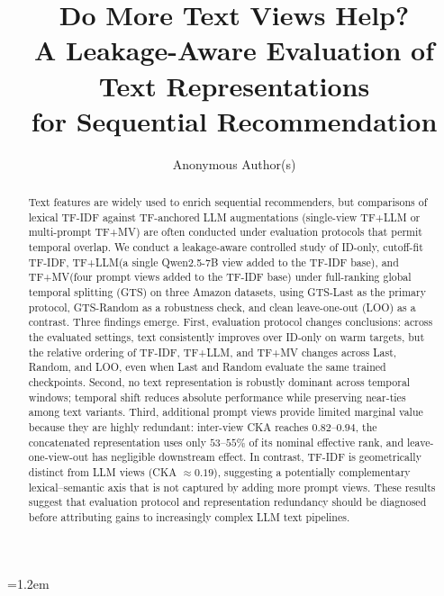 \documentclass[sigconf,natbib=true,anonymous]{acmart}
\newcommand{\tfidf}{\textsc{TF-IDF}\xspace}
\newcommand{\tfllm}{\textsc{TF+LLM}\xspace}
\newcommand{\tfmv}{\textsc{TF+MV}\xspace}
\begin{document}
\emergencystretch=1.2em

\title{Do More Text Views Help?\\
A Leakage-Aware Evaluation of Text Representations\\
for Sequential Recommendation}

\author{Anonymous Author(s)}
\renewcommand{\shortauthors}{Anonymous}

\begin{abstract}
Text features are widely used to enrich sequential recommenders, but comparisons of lexical \tfidf against TF-anchored LLM augmentations (single-view \tfllm or multi-prompt \tfmv) are often conducted under evaluation protocols that permit temporal overlap.
We conduct a leakage-aware controlled study of ID-only, cutoff-fit \tfidf, \tfllm (a single Qwen2.5-7B view added to the \tfidf base), and \tfmv (four prompt views added to the \tfidf base) under full-ranking global temporal splitting (GTS) on three Amazon datasets, using GTS-Last as the primary protocol, GTS-Random as a robustness check, and clean leave-one-out (LOO) as a contrast.
Three findings emerge.
First, evaluation protocol changes conclusions: across the evaluated settings, text consistently improves over ID-only on warm targets, but the relative ordering of \tfidf, \tfllm, and \tfmv changes across Last, Random, and LOO, even when Last and Random evaluate the same trained checkpoints.
Second, no text representation is robustly dominant across temporal windows; temporal shift reduces absolute performance while preserving near-ties among text variants.
Third, additional prompt views provide limited marginal value because they are highly redundant: inter-view CKA reaches $0.82$--$0.94$, the concatenated representation uses only $53$--$55\%$ of its nominal effective rank, and leave-one-view-out has negligible downstream effect.
In contrast, TF-IDF is geometrically distinct from LLM views (CKA $\approx 0.19$), suggesting a potentially complementary lexical--semantic axis that is not captured by adding more prompt views.
These results suggest that evaluation protocol and representation redundancy should be diagnosed before attributing gains to increasingly complex LLM text pipelines.
\end{abstract}
\end{document}
